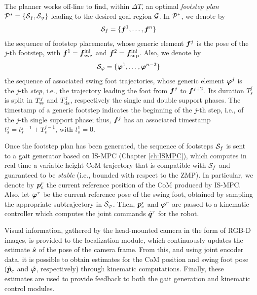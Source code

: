 The planner works off-line to find, within $\Delta T$, an optimal
\textit{footstep plan} ${\cal P}^\ast = \{ {\cal S}_f, {\cal S}_\varphi \}$
leading to the desired goal region $\cal G$. In ${\cal P}^*$, we denote by
\begin{equation*}
    {\cal S}_f = \{{\bm{f}}^1, \dots, {\bm{f}}^n\}
\end{equation*}
the sequence of footstep placements, whose generic element ${\bm{f}}^j$ is the
pose of the $j$-th footstep, with ${\bm{f}}^1 = {\bm{f}}_{\rm swg}^{\rm ini}$ and
${\bm{f}}^2 = {\bm{f}}_{\rm sup}^{\rm ini}$. Also, we denote by
\begin{equation*}
    {\cal S}_\varphi = \{{\bm{\varphi}}^1, \dots, {\bm{\varphi}}^{n-2}\}
\end{equation*} 
the sequence of associated swing foot trajectories, whose generic element
${\bm{\varphi}}^j$ is the $j$-th {\em step}, i.e., the trajectory leading the foot
from ${\bm{f}}^{j}$ to ${\bm{f}}^{j+2}$. Its duration $T_s^j$ is split in $T_{\rm ss}^j$
and $T_{\rm ds}^j$, respectively the single and double support phases. 
The timestamp of a generic footstep indicates the beginning of the $j$-th step,
i.e., of the $j$-th single support phase; thus, ${\bm{f}}^{j}$ has an associated
timestamp $t_s^{j} = t_s^{j-1} + T_s^{j-1}$, with $t_s^{1}=0$.

Once the footstep plan has been generated, the sequence of footsteps
${\cal S}_{f}$ is sent to a gait generator based on IS-MPC
(Chapter \ref{ch:ISMPC}), which computes in real time a variable-height
CoM trajectory that
is compatible with ${\cal S}_{f}$ and guaranteed to be {\em stable} (i.e.,
bounded with respect to the ZMP). In particular, we denote by ${\bm{p}}_{\rm c}^r$
the current reference position of the CoM produced by IS-MPC. Also, let
${\bm{\varphi}}^r$ be the current reference pose of the swing foot, obtained by
sampling the appropriate subtrajectory in ${\cal S}_{\varphi}$. Then,
${\bm{p}}_{\rm c}^r$ and ${\bm{\varphi}}^r$ are passed to a kinematic controller which
computes the joint commands $\dot{{\bm{q}}}^r$ for the robot.

Visual information, gathered by the head-mounted camera in the form of RGB-D
images, is provided to the localization module, which continuously updates the
estimate $\hat{{\bm{s}}}$ of the pose of the camera frame.
From this, and using joint encoder data, it is possible to obtain estimates for
the CoM position and swing foot pose ($\hat {{\bm{p}}}_c$ and $\hat {{\bm{\varphi}}}$,
respectively) through kinematic computations. Finally, these estimates are used
to provide feedback to both the gait generation and kinematic control modules.

